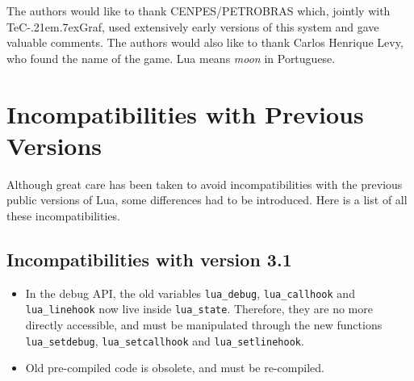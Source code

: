 \documentclass[11pt]{article}
\def\tecgraf{{\sf TeC\kern-.21em\lower.7ex\hbox{Graf}}}
\newcommand{\Index}[1]{#1\index{#1}}
\begin{document}
The authors would like to thank CENPES/PETROBRAS which,
jointly with \tecgraf, used extensively early versions of
this system and gave valuable comments.
The authors would also like to thank Carlos Henrique Levy,
who found the name of the game.
Lua means \emph{moon} in Portuguese.



\appendix

\section*{Incompatibilities with Previous Versions}

Although great care has been taken to avoid incompatibilities with
the previous public versions of Lua,
some differences had to be introduced.
Here is a list of all these incompatibilities.

\subsection*{Incompatibilities with \Index{version 3.1}}
\begin{itemize}
\item
In the debug API, the old variables \verb|lua_debug|,
\verb|lua_callhook| and \verb|lua_linehook| now live inside \verb|lua_state|.
Therefore, they are no more directly accessible, and must be
manipulated through the new functions \verb|lua_setdebug|,
\verb|lua_setcallhook| and \verb|lua_setlinehook|.

\item Old pre-compiled code is obsolete, and must be re-compiled.
\end{itemize}
\end{document}
